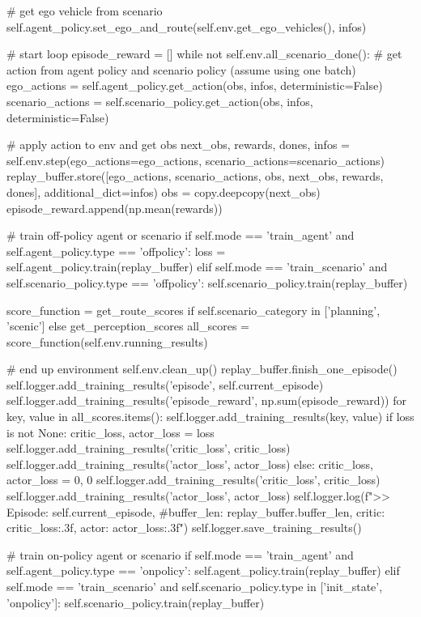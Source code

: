 \begin{appendix}
\# get ego vehicle from scenario
self.agent\_policy.set\_ego\_and\_route(self.env.get\_ego\_vehicles(), infos)

\# start loop
episode\_reward = []
while not self.env.all\_scenario\_done():
\# get action from agent policy and scenario policy (assume using one batch)
ego\_actions = self.agent\_policy.get\_action(obs, infos, deterministic=False)
scenario\_actions = self.scenario\_policy.get\_action(obs, infos, deterministic=False)

\# apply action to env and get obs
next\_obs, rewards, dones, infos = self.env.step(ego\_actions=ego\_actions, scenario\_actions=scenario\_actions)
replay\_buffer.store([ego\_actions, scenario\_actions, obs, next\_obs, rewards, dones], additional\_dict=infos)
obs = copy.deepcopy(next\_obs)
episode\_reward.append(np.mean(rewards))

\# train off-policy agent or scenario
if self.mode == 'train\_agent' and self.agent\_policy.type == 'offpolicy':
loss = self.agent\_policy.train(replay\_buffer)
elif self.mode == 'train\_scenario' and self.scenario\_policy.type == 'offpolicy':
self.scenario\_policy.train(replay\_buffer)

score\_function = get\_route\_scores if self.scenario\_category in ['planning', 'scenic'] else get\_perception\_scores
all\_scores = score\_function(self.env.running\_results)

\# end up environment
self.env.clean\_up()
replay\_buffer.finish\_one\_episode()
self.logger.add\_training\_results('episode', self.current\_episode)
self.logger.add\_training\_results('episode\_reward', np.sum(episode\_reward))
for key, value in all\_scores.items():
self.logger.add\_training\_results(key, value)
if loss is not None:
critic\_loss, actor\_loss = loss
self.logger.add\_training\_results('critic\_loss', critic\_loss)
self.logger.add\_training\_results('actor\_loss', actor\_loss)
else:
critic\_loss, actor\_loss = 0, 0
self.logger.add\_training\_results('critic\_loss', critic\_loss)
self.logger.add\_training\_results('actor\_loss', actor\_loss)  
self.logger.log(f">> Episode: {self.current\_episode}, \#buffer\_len: {replay\_buffer.buffer\_len}, critic: {critic\_loss:.3f}, actor: {actor\_loss:.3f}")
self.logger.save\_training\_results()

\# train on-policy agent or scenario
if self.mode == 'train\_agent' and self.agent\_policy.type == 'onpolicy':
self.agent\_policy.train(replay\_buffer)
elif self.mode == 'train\_scenario' and self.scenario\_policy.type in ['init\_state', 'onpolicy']:
self.scenario\_policy.train(replay\_buffer)


\end{appendix}
